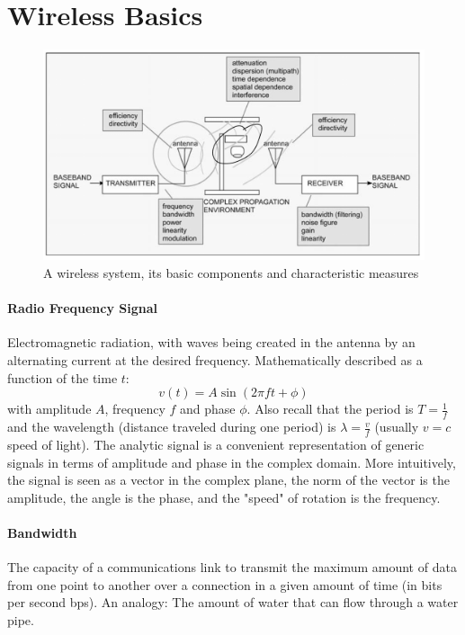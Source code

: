 \section{Wireless Basics}

\begin{figure}[h]
	\centering
	\includegraphics[scale=0.4]{images/1-wireless-system.png}
	\caption{A wireless system, its basic components and characteristic measures}%
	\label{fig:wireless-system}
\end{figure}

\paragraph{Radio Frequency Signal}
Electromagnetic radiation, with waves being created in the antenna by an
alternating current at the desired frequency. Mathematically described as a
function of the time $t$:
\[ v(t) = A \sin (2 \pi f t + \phi) \]
with amplitude $A$, frequency $f$ and phase $\phi$. Also recall that the period
is $T = \frac{1}{f}$ and the wavelength (distance traveled during one period)
is $\lambda = \frac{v}{f}$ (usually $v=c$ speed of light).
The analytic signal is a convenient representation of generic signals in terms of amplitude and phase in the complex domain.
More intuitively, the signal is seen as a vector in the complex plane, the norm of the vector is the amplitude, the angle is the phase, and the "speed" of rotation is the frequency.

\paragraph{Bandwidth}
The capacity of a communications link to transmit the maximum amount of data
from one point to another over a connection in a given amount of time (in bits
per second bps). An analogy: The amount of water that can flow through a water
pipe.


